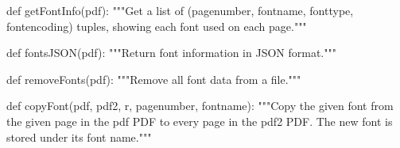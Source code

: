 def getFontInfo(pdf):
    """Get a list of (pagenumber, fontname, fonttype, fontencoding) tuples,
    showing each font used on each page."""

def fontsJSON(pdf):
    """Return font information in JSON format."""

def removeFonts(pdf):
    """Remove all font data from a file."""

def copyFont(pdf, pdf2, r, pagenumber, fontname):
    """Copy the given font from the given page in the pdf PDF to every page in
    the pdf2 PDF. The new font is stored under its font name."""
